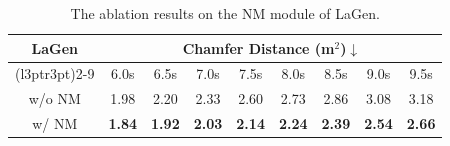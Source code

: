 \begin{table}[ht]
\centering
\caption{The ablation results on the NM module of LaGen.}
\vspace{-1mm}
\setlength{\tabcolsep}{3pt}
\renewcommand{\arraystretch}{1.17}
\begin{tabular}{ccccccccc}
\toprule
 \textbf{LaGen} &
\multicolumn{8}{c}{\textbf{Chamfer Distance (m$^2$)$\downarrow$}} \\
\cmidrule(l{3pt}r{3pt}){2-9} 
& 6.0s & 6.5s & 7.0s & 7.5s & 8.0s & 8.5s & 9.0s & 9.5s \\ 
\midrule
w/o NM
&1.98 & 2.20 & 2.33 & 2.60 & 2.73 & 2.86 & 3.08 & 3.18\\
\midrule
w/ NM
& \textbf{1.84} & \textbf{1.92} & \textbf{2.03} & \textbf{2.14} & \textbf{2.24} & \textbf{2.39} & \textbf{2.54} & \textbf{2.66}\\
\bottomrule
\end{tabular}
\label{table_ablation_nm}
\vspace{-4mm}
\end{table}
